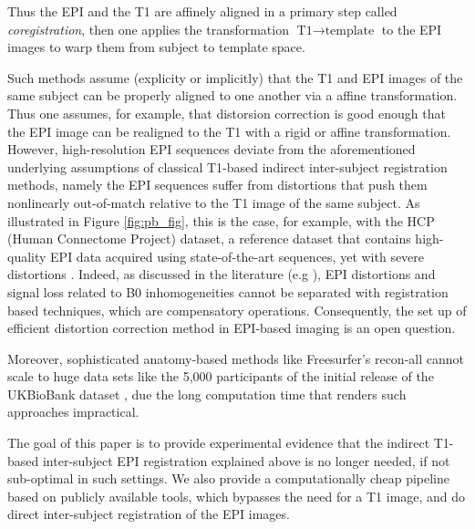 Thus the EPI and the T1 are affinely aligned in a primary step called
\textit{coregistration}, then one applies the transformation $\text{T1}
\rightarrow \text{template}$ to the EPI images to warp them from subject to
template space. %

Such methods assume (explicity or implicitly) that the T1 and EPI images
of the same subject can be properly aligned to one another via a affine transformation.
Thus one assumes, for example, that distorsion correction is
good enough that the EPI image can be realigned to the T1 with a rigid or affine
transformation. However, high-resolution EPI sequences deviate from the
aforementioned underlying assumptions of classical T1-based indirect inter-subject
registration methods, namely the EPI sequences suffer from distortions
that push them nonlinearly out-of-match relative to the T1 image of
the same subject. 
%
As illustrated in Figure \ref{fig:pb_fig}, this is the case, for
example, with the HCP (Human Connectome Project)
\citep{VanEssen20122222} dataset, a reference dataset that contains
high-quality EPI data acquired using state-of-the-art sequences, yet
with severe distortions
\citep{pmid9178246,pmid12270226,zeng2002,anderson2003}.
%
Indeed, as discussed in the literature (e.g \citep{pmid12071618}), EPI
distortions and signal loss related to B0 inhomogeneities cannot be
separated with registration based techniques, which are compensatory
operations.  Consequently, the set up of efficient distortion
correction method in EPI-based imaging is an open question.

Moreover, sophisticated anatomy-based methods like Freesurfer's
recon-all cannot scale to huge data sets like the 5,000 participants
of the initial release of the UKBioBank dataset \citep{Miller2016}, due
the long computation time 
%
that renders such approaches impractical.

The goal of this paper is to provide experimental evidence that the
indirect T1-based inter-subject EPI registration explained above is no
longer needed, if not sub-optimal in such settings. We also provide a
computationally cheap pipeline based on publicly available tools,
which bypasses the need for a T1 image, and do direct inter-subject
registration of the EPI images.

